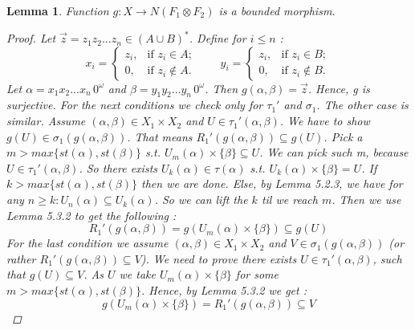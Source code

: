 \documentclass[12pt, a4paper]{scrartcl}
\newtheorem{lemma}[definition]{Lemma}
\begin{document}
\begin{lemma}
    Function $g : X \rightarrow N(F_1 \otimes F_2)$ is a bounded morphism.

    \begin{proof}
        Let $\vec{z} = z_1z_2...z_n \in (A \cup B)^*$. Define for $i \leq n$ :
        \[
            x_i = 
            \begin{cases}
            z_i, & \text{if } z_i \in A; \\
            0, & \text{if } z_i \notin A.
            \end{cases}
            \qquad
            y_i = 
            \begin{cases}
            z_i, & \text{if } z_i \in B; \\
            0, & \text{if } z_i \notin B.
            \end{cases}
        \] \newline
        Let $\alpha = x_1x_2...x_n \, 0^\omega$ and $\beta = y_1y_2...y_n \, 0^\omega$. Then $g(\alpha,\beta) = \vec{z}$. Hence, g is surjective. \newline \newline
        For the next conditions we check only for $\tau_1'$ and $\sigma_1$. The other case is similar.
        Assume $(\alpha,\beta) \in X_1 \times X_2$ and $U \in \tau_1'(\alpha, \beta)$. We have to show $g(U) \in \sigma_1(g(\alpha,\beta))$. That means $R_1'(g(\alpha,\beta)) \subseteq g(U)$.
        Pick a $m > max\{st(\alpha), st(\beta)\}$ s.t. $U_m(\alpha) \times \{\beta\} \subseteq U$. We can pick such m, because $U \in \tau_1'(\alpha,\beta)$. So there exists $U_k(\alpha) \in \tau(\alpha)$ s.t. $U_k(\alpha) \times \{\beta\} = U$.
        If $k > max\{st(\alpha), st(\beta)\}$ then we are done. Else, by Lemma 5.2.3, we have for any $n \geq k : U_n(\alpha) \subseteq U_k(\alpha)$. So we can lift the $k$ til we reach $m$. Then we use Lemma 5.3.2 to get the following :
        $$R_1'(g(\alpha,\beta)) = g(U_m(\alpha) \times \{\beta\}) \subseteq g(U)$$
        \newline
        For the last condition we assume $(\alpha, \beta) \in X_1 \times X_2$ and $V \in \sigma_1(g(\alpha,\beta))$ (or rather $R_1'(g(\alpha,\beta)) \subseteq V$).
        We need to prove there exists $U \in \tau_1'(\alpha,\beta)$, such that $g(U) \subseteq V$. As $U$ we take $U_m(\alpha) \times \{\beta\}$ for some $m > max\{st(\alpha), st(\beta)\}$. Hence, by Lemma 5.3.2 we get :
        $$g(U_m(\alpha) \times \{\beta\}) = R_1'(g(\alpha,\beta)) \subseteq V$$

    \end{proof}
\end{lemma}
\end{document}
